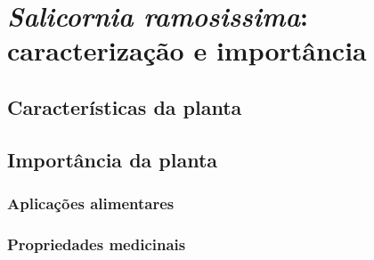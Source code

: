 
\chapter{ \textit{Salicornia ramosissima}:  caracterização e importância}



\section{Características da planta}



\cite{Toz}
\cite{Jose12}

\section{Importância da planta}


\subsection{Aplicações alimentares}



\subsection{Propriedades medicinais}











